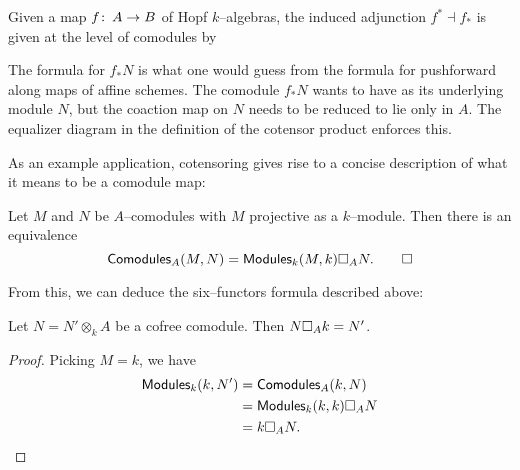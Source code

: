 \begin{lemma}
Given a map $f \colon\thinspace A \to B$ of Hopf $k$--algebras, the induced adjunction $f^* \dashv f_*$ is given at the level of comodules by
\begin{center}
\end{center}
\end{lemma}

\begin{remark}
The formula for $f_* N$ is what one would guess from the formula for pushforward along maps of affine schemes.  The comodule $f_* N$ wants to have as its underlying module $N$, but the coaction map on $N$ needs to be reduced to lie only in $A$.  The equalizer diagram in the definition of the cotensor product enforces this.
\end{remark}

\noindent As an example application, cotensoring gives rise to a concise description of what it means to be a comodule map:

\begin{lemma}
Let $M$ and $N$ be $A$--comodules with $M$ projective as a $k$--module.  Then there is an equivalence \[\mathsf{Comodules}_A(M, N) = \mathsf{Modules}_k(M, k) \square_A N. \qed\]
\end{lemma}

\noindent From this, we can deduce the six--functors formula described above:

\begin{corollary}
Let $N = N' \otimes_k A$ be a cofree comodule. Then $N \square_A k = N'$.
\end{corollary}
\begin{proof}
Picking $M = k$, we have
\begin{align*}
\mathsf{Modules}_k(k, N') & = \mathsf{Comodules}_A(k, N) \\
& = \mathsf{Modules}_k(k, k) \square_A N \\
& = k \square_A N. \qedhere
\end{align*}
\end{proof}


